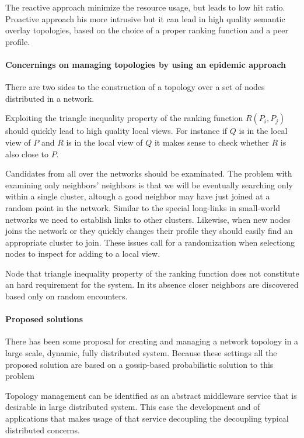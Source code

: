 The reactive approach minimize the resource usage, but leads to low hit ratio. Proactive approach his more intrusive but it can lead in high quality semantic overlay topologies, based on the choice of a proper ranking function and a peer profile.

\paragraph{Concernings on managing topologies by using an epidemic approach} There are two sides to the construction of a topology over a set of nodes distributed in a network.

Exploiting the triangle inequality property of the ranking function $R(P_i,P_j)$ should quickly lead to high quality local views. For instance if $Q$ is in the local view of $P$ and $R$ is in the local view of $Q$ it makes sense to check whether $R$ is also close to $P$.

Candidates from all over the networks should be examinated. The problem with examining only neighbors' neighbors is that we will be eventually searching only within a single cluster, altough a good neighbor may have just joined at a random point in the network. Similar to the special long-links in small-world networks we need to establish links to other clusters. Likewise, when new nodes joins the network or they quickly changes their profile they should easily find an appropriate cluster to join. These issues call for a randomization when selectiong nodes to inspect for adding to a local view.

Node that triangle inequality property of the ranking function does not constitute an hard requirement for the system. In its absence closer neighbors are discovered based only on random encounters.

\paragraph{Proposed solutions} There has been some proposal for creating and managing a network topology in a large scale, dynamic, fully distributed system. Because these settings all the proposed solution are based on a gossip-based probabilistic solution to this problem

Topology management can be identified as an abstract middleware service that is desirable in large distributed system. This ease the development and of applications that makes usage of that service decoupling the decoupling typical distributed concerns.

